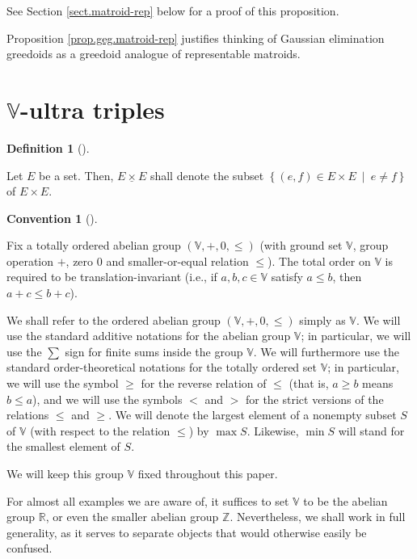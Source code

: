 \documentclass[numbers=enddot,12pt,final,onecolumn,notitlepage]{scrartcl}%
\theoremstyle{definition}
\newtheorem{defi}[theo]{Definition}
\newenvironment{definition}[1][]
{\begin{defi}[#1]\begin{leftbar}}
{\end{leftbar}\end{defi}}
\newtheorem{conv}[theo]{Convention}
\newenvironment{convention}[1][]
{\begin{conv}[#1]\begin{leftbar}}
{\end{leftbar}\end{conv}}
\newenvironment{convention}[1][Convention]{\noindent\textbf{#1.} }{\ \rule{0.5em}{0.5em}}
\let\sumnonlimits\sum
\renewcommand{\sum}{\sumnonlimits\limits}
\newcommand{\timesu}{\mathbin{\underline{\times}}}
\renewcommand{\leq}{\leqslant}
\renewcommand{\geq}{\geqslant}
\theoremstyle{plainsl}
\begin{document}
See Section \ref{sect.matroid-rep} below for a proof of this proposition.

Proposition \ref{prop.geg.matroid-rep} justifies thinking of Gaussian
elimination greedoids as a greedoid analogue of representable matroids.

\section{\label{sect.Vultra}$\mathbb{V}$-ultra triples}

\begin{definition}
Let $E$ be a set. Then, $E\timesu E$ shall denote the subset $\left\{  \left(
e,f\right)  \in E\times E\ \mid\ e\neq f\right\}  $ of $E\times E$.
\end{definition}

\begin{convention}
\label{conv.V}Fix a totally ordered abelian group $\left(  \mathbb{V}%
,+,0,\leq\right)  $ (with ground set $\mathbb{V}$, group operation $+$, zero
$0$ and smaller-or-equal relation $\leq$). The total order on $\mathbb{V}$ is
required to be translation-invariant (i.e., if $a,b,c\in\mathbb{V}$ satisfy
$a\leq b$, then $a+c\leq b+c$).

We shall refer to the ordered abelian group $\left(  \mathbb{V},+,0,\leq
\right)  $ simply as $\mathbb{V}$. We will use the standard additive notations
for the abelian group $\mathbb{V}$; in particular, we will use the $\sum$ sign
for finite sums inside the group $\mathbb{V}$. We will furthermore use the
standard order-theoretical notations for the totally ordered set $\mathbb{V}$;
in particular, we will use the symbol $\geq$ for the reverse relation of
$\leq$ (that is, $a\geq b$ means $b\leq a$), and we will use the symbols $<$
and $>$ for the strict versions of the relations $\leq$ and $\geq$. We will
denote the largest element of a nonempty subset $S$ of $\mathbb{V}$ (with
respect to the relation $\leq$) by $\max S$. Likewise, $\min S$ will stand for
the smallest element of $S$.

We will keep this group $\mathbb{V}$ fixed throughout this paper.
\end{convention}

For almost all examples we are aware of, it suffices to set $\mathbb{V}$ to be
the abelian group $\mathbb{R}$, or even the smaller abelian group $\mathbb{Z}%
$. Nevertheless, we shall work in full generality, as it serves to separate
objects that would otherwise easily be confused.
\end{document}
